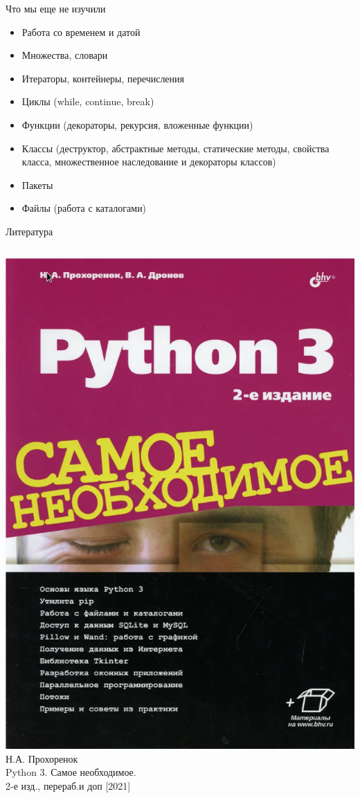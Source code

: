 \documentclass[12pt]{beamer}
\begin{document}
\begin{frame}{Что мы еще не изучили}
\begin{itemize}
\item Работа со временем и датой
\item Множества, словари
\item Итераторы, контейнеры, перечисления
\item Циклы (while, continue, break)
\item Функции (декораторы, рекурсия, вложенные функции)
\item Классы (деструктор, абстрактные методы, статические методы, свойства класса, множественное наследование и декораторы классов)
\item Пакеты
\item Файлы (работа с каталогами)
\end{itemize}
\end{frame}


\begin{frame}{Литература}
\begin{columns}[onlytextwidth,T]
    \column{30mm}
	\includegraphics[scale=0.35]{image/python_prohor.png}
    \column{\dimexpr\linewidth-30mm-20mm}
	Н.А. Прохоренок \\Python 3. Самое необходимое. \\2-е изд., перераб.и доп [2021]         
    \end{columns}  
\end{frame}
\end{document}

